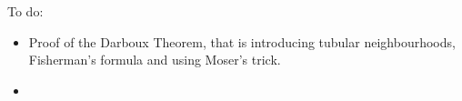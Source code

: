 \tableofcontents

\color{red}
To do:
\begin{itemize}
	\item Proof of the Darboux Theorem, that is introducing tubular neighbourhoods, Fisherman's formula and using Moser's trick.
	\item 
\end{itemize}
\color{black}

\mainmatter

\renewcommand*{\thefootnote}{\arabic{footnote}}




\appendix
\renewcommand{\theequation}{\thechapter.\arabic{equation}}

\begin{appendix}

\end{appendix}

\printbibliography
\printindex


